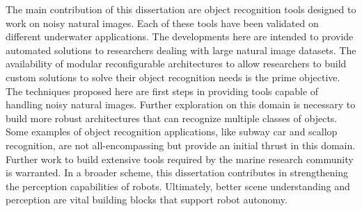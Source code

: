 \documentclass {udthesis}
\begin{document}
The main contribution of this dissertation are object recognition tools designed to work on noisy natural images. Each of these tools have been validated on different underwater applications. The developments here are intended to provide automated solutions to researchers dealing with large natural image datasets.
The availability of modular reconfigurable architectures to allow researchers to build custom solutions to solve their object recognition needs is the prime objective. The techniques proposed here are first steps in providing tools capable of handling noisy natural images. Further exploration on this domain is necessary to build more robust architectures that can recognize multiple classes of objects. Some examples of object recognition applications, like subway car and scallop recognition, are not all-encompassing but provide an initial thrust in this domain. Further work to build extensive tools required by the marine research community is warranted. In a broader scheme, this dissertation contributes in strengthening the perception capabilities of robots. Ultimately, better scene understanding and perception are vital building blocks that support robot autonomy.


\printglossary[type=\acronymtype]                  
\end{document}
